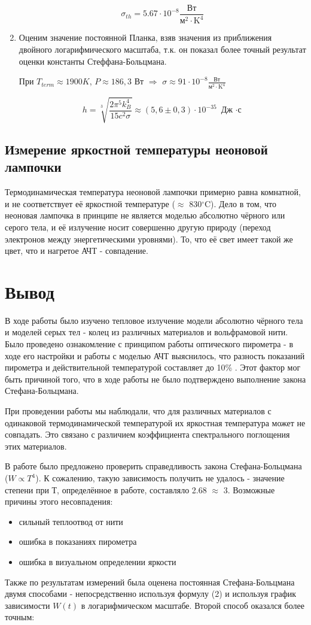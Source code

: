 \documentclass[15pt,a5paper,reqno]{article}
\begin{document}
\begin{enumerate}
\[  \sigma_{th} = 5.67 \cdot 10^{-8}  \frac{\text{Вт}}{\text{м}^2 \cdot \text{K}^{4}} \]
\item Оценим значение постоянной Планка, взяв значения из приближения двойного логарифмического масштаба, т.к. он показал более точный результат оценки константы Стеффана-Больцмана.


При $T_{term} \approx 1900 K$, $P \approx 186,3$ Вт $\Rightarrow$ $\sigma \approx 91 \cdot 10^{-8} \frac{\text{Вт}}{\text{м}^2 \cdot \text{K}^{4}}   $ 

\[ h = \sqrt[3]{\frac{2 \pi^5 k_B^4}{15 c^2 \sigma}} \approx  (5,6 \pm 0,3) \cdot 10^{-35}  \text{ Дж $\cdot$с} \]

\end{enumerate}

\subsection{Измерение яркостной температуры неоновой лампочки}
Термодинамическая температура неоновой лампочки примерно равна комнатной, и не соответствует её яркостной температуре ($\approx$ 830$^{\circ}$C). Дело в том, что неоновая лампочка в принципе не является моделью абсолютно чёрного или серого тела, и её излучение носит совершенно другую природу (переход электронов между энергетическими уровнями). То, что её свет имеет такой же цвет, что и нагретое АЧТ - совпадение.

\section{Вывод}
В ходе работы было изучено тепловое излучение модели абсолютно чёрного тела и моделей серых тел - колец из различных материалов и вольфрамовой нити. Было проведено ознакомление с принципом работы оптического пирометра - в ходе его настройки и работы с моделью АЧТ выяснилось, что разность показаний пирометра и действительной температурой составляет до 10\% . 
Этот фактор мог быть причиной того, что в ходе работы не было подтверждено выполнение закона Стефана-Больцмана. \par
При проведении работы мы наблюдали, что для различных материалов с одинаковой термодинамической температурой их яркостная температура может не совпадать. Это связано с различием коэффициента спектрального поглощения этих материалов. \par
В работе было предложено проверить справедливость закона Стефана-Больцмана ($W \propto T^4$). К сожалению, такую зависимость получить не удалось - значение степени при Т, определённое в работе, составляло 2.68 $\approx$ 3. Возможные причины этого несовпадения:
\begin{itemize}
    \item сильный теплоотвод от нити
    \item ошибка в показаниях пирометра
    \item ошибка в визуальном определении яркости
\end{itemize}
Также по результатам измерений была оценена постоянная Стефана-Больцмана двумя способами - непосредственно используя формулу (2) и используя график зависимости $W(t)$ в логарифмическом масштабе. Второй способ оказался более точным:
\end{document}
